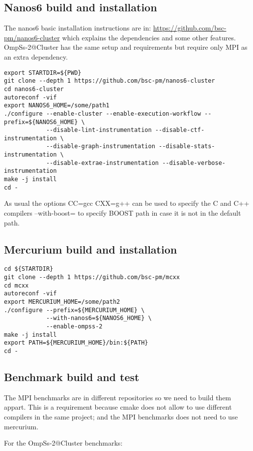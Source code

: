 \documentclass{article}
\begin{document}
\subsection{Nanos6 build and installation}

The nanos6 basic installation instructions are in:
\url{https://github.com/bsc-pm/nanos6-cluster} which explains the
dependencies and some other features.  OmpSs-2@Cluster has the same
setup and requirements but require only MPI as an extra dependency.

\begin{lstlisting}
export STARTDIR=${PWD}
git clone --depth 1 https://github.com/bsc-pm/nanos6-cluster
cd nanos6-cluster
autoreconf -vif
export NANOS6_HOME=/some/path1
./configure --enable-cluster --enable-execution-workflow --prefix=${NANOS6_HOME} \
            --disable-lint-instrumentation --disable-ctf-instrumentation \
            --disable-graph-instrumentation --disable-stats-instrumentation \
            --disable-extrae-instrumentation --disable-verbose-instrumentation
make -j install
cd -
\end{lstlisting}

As usual the options CC=gcc CXX=g++ can be used to specify the C and
C++ compilers --with-boost= to specify BOOST path in case it is not in
the default path.

\subsection{Mercurium build and installation}

\begin{lstlisting}
cd ${STARTDIR}
git clone --depth 1 https://github.com/bsc-pm/mcxx
cd mcxx
autoreconf -vif
export MERCURIUM_HOME=/some/path2
./configure --prefix=${MERCURIUM_HOME} \
            --with-nanos6=${NANOS6_HOME} \
            --enable-ompss-2
make -j install
export PATH=${MERCURIUM_HOME}/bin:${PATH}
cd -
\end{lstlisting}

\subsection{Benchmark build and test}

The MPI benchmarks are in different repositories so we need to build
them appart. This is a requirement because cmake does not allow to use
different compilers in the same project; and the MPI benchmarks does
not need to use mercurium.

For the OmpSs-2@Cluster benchmarks:
\end{document}
